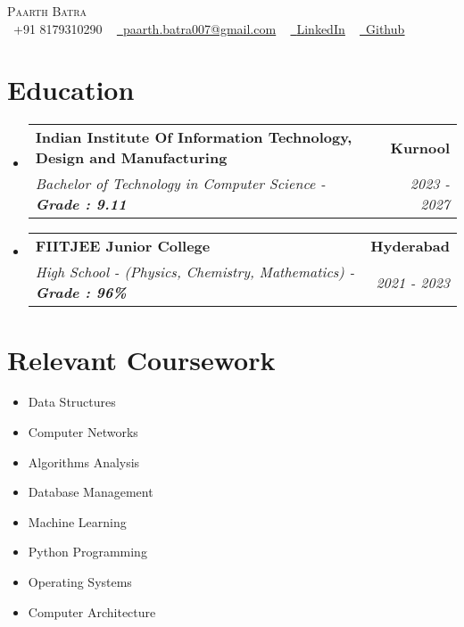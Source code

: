 \documentclass[letterpaper,11pt]{article}
\makeatletter
\newcommand{\resumeSubheading}[4]{
  \vspace{-2pt}\item
    \begin{tabular*}{1.0\textwidth}[t]{l@{\extracolsep{\fill}}r}
      \textbf{#1} & \textbf{\small #2} \\
      \textit{\small#3} & \textit{\small #4} \\
    \end{tabular*}\vspace{-7pt}
}
\newcommand{\resumeSubHeadingListStart}{\begin{itemize}[leftmargin=0.0in, label={}]}
\newcommand{\resumeSubHeadingListEnd}{\end{itemize}}
\makeatother
\begin{document}

\begin{center}
    {\Huge \scshape Paarth Batra} \\ \vspace{1pt}
     \vspace{1pt}
    \small \raisebox{-0.1\height}\faPhone\ +91 8179310290 ~ \href{mailto:paarth.batra007@gmail.com}{\raisebox{-0.2\height}\faEnvelope\  \underline{paarth.batra007@gmail.com}} ~ 
    \href{https://www.linkedin.com/in/paarth7}{\raisebox{-0.2\height}\faLinkedin\ \underline{LinkedIn}}  ~
    \href{https://github.com/hydro-7}{\raisebox{-0.2\height}\faGithub\ \underline{Github}}
    \vspace{-7pt}
\end{center}


\section{Education}
  \resumeSubHeadingListStart
    \resumeSubheading
      {Indian Institute Of Information Technology, Design and Manufacturing}{Kurnool}
      {Bachelor of Technology in Computer Science - \textbf{Grade : 9.11}}{2023 - 2027}
      \vspace{-3pt}
     \resumeSubheading
  {FIITJEE Junior College}{Hyderabad}
  {High School - (Physics, Chemistry, Mathematics) - \textbf{Grade : 96\%}}{2021 - 2023}
  \resumeSubHeadingListEnd
    \vspace{-12pt}
\section{Relevant Coursework}
        \begin{multicols}{4}
            \begin{itemize}[itemsep=-5pt, parsep=3pt]
                \item\small Data Structures
                \item Computer Networks
                \item Algorithms Analysis
                \item Database Management
                \item Machine Learning
                \item Python Programming
                \item Operating Systems
                \item Computer Architecture
            \end{itemize}
        \end{multicols}
        \vspace*{2.0\multicolsep}
\end{document}
